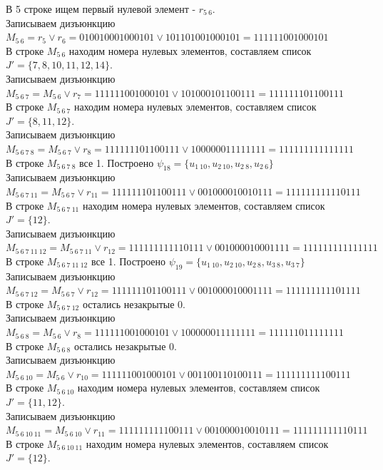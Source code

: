 \documentclass[a4paper,12pt]{article}
\begin{document}
\noindent
В 5 строке ищем первый нулевой элемент - $r_{5\ 6}$.\\
Записываем дизъюнкцию $M_{5\ 6} = r_{5}\lor r_{6} = 010010001000101 \lor 101101001000101 = 111111001000101$\\
В строке $M_{5\ 6}$ находим номера нулевых элементов, составляем список $J' = \{7, 8, 10, 11, 12, 14\}$.\\
Записываем дизъюнкцию $M_{5\ 6\ 7} = M_{5\ 6}\lor r_{7} = 111111001000101 \lor 101000101100111 = 111111101100111$\\
В строке $M_{5\ 6\ 7}$ находим номера нулевых элементов, составляем список $J' = \{8, 11, 12\}$.\\
Записываем дизъюнкцию $M_{5\ 6\ 7\ 8} = M_{5\ 6\ 7}\lor r_{8} = 111111101100111 \lor 100000011111111 = 111111111111111$\\
В строке $M_{5\ 6\ 7\ 8}$ все 1. Построено $\psi_{18} = \{u_{1\ 10},u_{2\ 10},u_{2\ 8},u_{2\ 6}\}$\\
Записываем дизъюнкцию $M_{5\ 6\ 7\ 11} = M_{5\ 6\ 7}\lor r_{11} = 111111101100111 \lor 001000010010111 = 111111111110111$\\
В строке $M_{5\ 6\ 7\ 11}$ находим номера нулевых элементов, составляем список $J' = \{12\}$.\\
Записываем дизъюнкцию $M_{5\ 6\ 7\ 11\ 12} = M_{5\ 6\ 7\ 11}\lor r_{12} = 111111111110111 \lor 001000010001111 = 111111111111111$\\
В строке $M_{5\ 6\ 7\ 11\ 12}$ все 1. Построено $\psi_{19} = \{u_{1\ 10},u_{2\ 10},u_{2\ 8},u_{3\ 8},u_{3\ 7}\}$\\
Записываем дизъюнкцию $M_{5\ 6\ 7\ 12} = M_{5\ 6\ 7}\lor r_{12} = 111111101100111 \lor 001000010001111 = 111111111101111$\\
В строке $M_{5\ 6\ 7\ 12}$ остались незакрытые 0.\\
Записываем дизъюнкцию $M_{5\ 6\ 8} = M_{5\ 6}\lor r_{8} = 111111001000101 \lor 100000011111111 = 111111011111111$\\
В строке $M_{5\ 6\ 8}$ остались незакрытые 0.\\
Записываем дизъюнкцию $M_{5\ 6\ 10} = M_{5\ 6}\lor r_{10} = 111111001000101 \lor 001100110100111 = 111111111100111$\\
В строке $M_{5\ 6\ 10}$ находим номера нулевых элементов, составляем список $J' = \{11, 12\}$.\\
Записываем дизъюнкцию $M_{5\ 6\ 10\ 11} = M_{5\ 6\ 10}\lor r_{11} = 111111111100111 \lor 001000010010111 = 111111111110111$\\
В строке $M_{5\ 6\ 10\ 11}$ находим номера нулевых элементов, составляем список $J' = \{12\}$.\\
\end{document}
